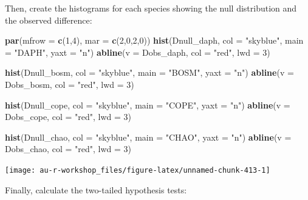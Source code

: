 \documentclass[]{book}
\newenvironment{Shaded}{\begin{snugshade}}{\end{snugshade}}
\newcommand{\KeywordTok}[1]{\textcolor[rgb]{0.13,0.29,0.53}{\textbf{#1}}}
\newcommand{\DataTypeTok}[1]{\textcolor[rgb]{0.13,0.29,0.53}{#1}}
\newcommand{\DecValTok}[1]{\textcolor[rgb]{0.00,0.00,0.81}{#1}}
\newcommand{\StringTok}[1]{\textcolor[rgb]{0.31,0.60,0.02}{#1}}
\newcommand{\NormalTok}[1]{#1}
\theoremstyle{definition}
\theoremstyle{definition}
\theoremstyle{definition}
\theoremstyle{remark}
\begin{document}
Then, create the histograms for each species showing the null
distribution and the observed difference:

\begin{Shaded}
\begin{Highlighting}[]
\KeywordTok{par}\NormalTok{(}\DataTypeTok{mfrow =} \KeywordTok{c}\NormalTok{(}\DecValTok{1}\NormalTok{,}\DecValTok{4}\NormalTok{), }\DataTypeTok{mar =} \KeywordTok{c}\NormalTok{(}\DecValTok{2}\NormalTok{,}\DecValTok{0}\NormalTok{,}\DecValTok{2}\NormalTok{,}\DecValTok{0}\NormalTok{))}
\KeywordTok{hist}\NormalTok{(Dnull_daph, }\DataTypeTok{col =} \StringTok{"skyblue"}\NormalTok{, }\DataTypeTok{main =} \StringTok{"DAPH"}\NormalTok{, }\DataTypeTok{yaxt =} \StringTok{"n"}\NormalTok{)}
\KeywordTok{abline}\NormalTok{(}\DataTypeTok{v =}\NormalTok{ Dobs_daph, }\DataTypeTok{col =} \StringTok{"red"}\NormalTok{, }\DataTypeTok{lwd =} \DecValTok{3}\NormalTok{)}

\KeywordTok{hist}\NormalTok{(Dnull_bosm, }\DataTypeTok{col =} \StringTok{"skyblue"}\NormalTok{, }\DataTypeTok{main =} \StringTok{"BOSM"}\NormalTok{, }\DataTypeTok{yaxt =} \StringTok{"n"}\NormalTok{)}
\KeywordTok{abline}\NormalTok{(}\DataTypeTok{v =}\NormalTok{ Dobs_bosm, }\DataTypeTok{col =} \StringTok{"red"}\NormalTok{, }\DataTypeTok{lwd =} \DecValTok{3}\NormalTok{)}

\KeywordTok{hist}\NormalTok{(Dnull_cope, }\DataTypeTok{col =} \StringTok{"skyblue"}\NormalTok{, }\DataTypeTok{main =} \StringTok{"COPE"}\NormalTok{, }\DataTypeTok{yaxt =} \StringTok{"n"}\NormalTok{)}
\KeywordTok{abline}\NormalTok{(}\DataTypeTok{v =}\NormalTok{ Dobs_cope, }\DataTypeTok{col =} \StringTok{"red"}\NormalTok{, }\DataTypeTok{lwd =} \DecValTok{3}\NormalTok{)}

\KeywordTok{hist}\NormalTok{(Dnull_chao, }\DataTypeTok{col =} \StringTok{"skyblue"}\NormalTok{, }\DataTypeTok{main =} \StringTok{"CHAO"}\NormalTok{, }\DataTypeTok{yaxt =} \StringTok{"n"}\NormalTok{)}
\KeywordTok{abline}\NormalTok{(}\DataTypeTok{v =}\NormalTok{ Dobs_chao, }\DataTypeTok{col =} \StringTok{"red"}\NormalTok{, }\DataTypeTok{lwd =} \DecValTok{3}\NormalTok{)}
\end{Highlighting}
\end{Shaded}

\begin{center}\texttt{[image: au-r-workshop\_files/figure-latex/unnamed-chunk-413-1]} \end{center}

Finally, calculate the two-tailed hypothesis tests:
\end{document}
